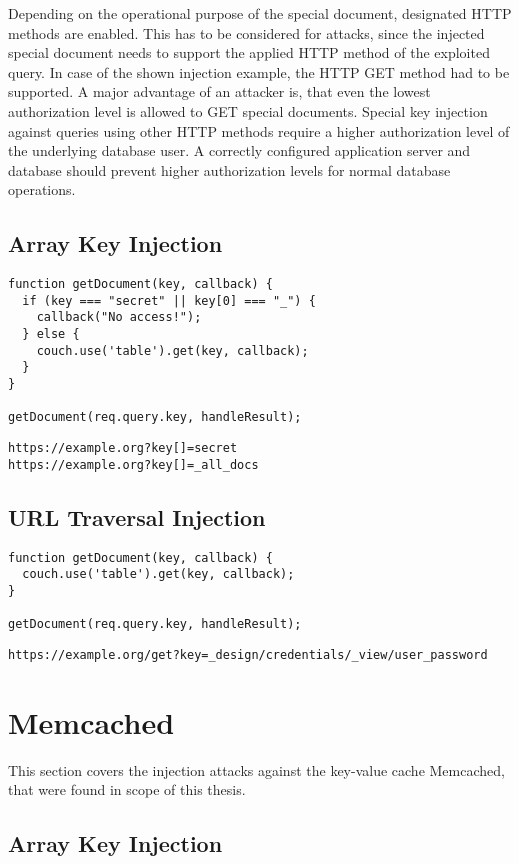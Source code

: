Depending on the operational purpose of the special document, designated HTTP methods are enabled. This has to be considered for attacks, since the injected special document needs to support the applied HTTP method of the exploited query. In case of the shown injection example, the HTTP GET method had to be supported. A major advantage of an attacker is, that even the lowest authorization level is allowed to GET special documents. Special key injection against queries using other HTTP methods require a higher authorization level of the underlying database user. A correctly configured application server and database should prevent higher authorization levels for normal database operations. \\

\subsection{Array Key Injection}

\begin{lstlisting}[caption={Vulnerable NodeJS example for array key injection on CouchDB}, label={lst:PHPArrayInjection}]
function getDocument(key, callback) {
  if (key === "secret" || key[0] === "_") {
    callback("No access!");
  } else {
    couch.use('table').get(key, callback);
  }
}

getDocument(req.query.key, handleResult);
\end{lstlisting}

\begin{lstlisting}[caption={Attack vectors on CouchDB for array key injection via HTTP GET}, label={lst:PHPArrayInjection}]
https://example.org?key[]=secret
https://example.org?key[]=_all_docs
\end{lstlisting}

\subsection{URL Traversal Injection}

\begin{lstlisting}[caption={Vulnerable NodeJS example for URL traversal injection on CouchDB}, label={lst:PHPArrayInjection}]
function getDocument(key, callback) {
  couch.use('table').get(key, callback);
}

getDocument(req.query.key, handleResult);
\end{lstlisting}

\begin{lstlisting}[caption={Attack vectors on CouchDB for URL traversal injection via HTTP GET}, label={lst:PHPArrayInjection}]
https://example.org/get?key=_design/credentials/_view/user_password
\end{lstlisting}

\section{Memcached}
This section covers the injection attacks against the key-value cache Memcached, that were found in scope of this thesis.
\subsection{Array Key Injection}